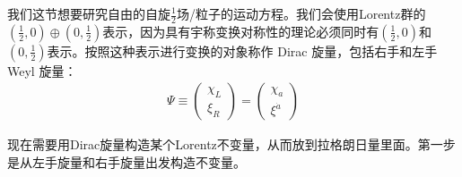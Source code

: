 我们这节想要研究自由的自旋$\frac{1}{2}$场/粒子的运动方程。我们会使用Lorentz群的$(\frac{1}{2},0)\oplus(0,\frac{1}{2})$表示，因为具有宇称变换对称性的理论必须同时有$(\frac{1}{2},0)$和$(0,\frac{1}{2})$表示。按照这种表示进行变换的对象称作 Dirac 旋量，包括右手和左手 Weyl 旋量：
\begin{align}
\label{equ6.6}
\Psi\equiv\begin{pmatrix}\chi_L\\ \xi_R\end{pmatrix}=\begin{pmatrix}\chi_a\\ \xi^{\dot{a}}\end{pmatrix}
\end{align}

现在需要用Dirac旋量构造某个Lorentz不变量，从而放到拉格朗日量里面。第一步是从左手旋量和右手旋量出发构造不变量。

